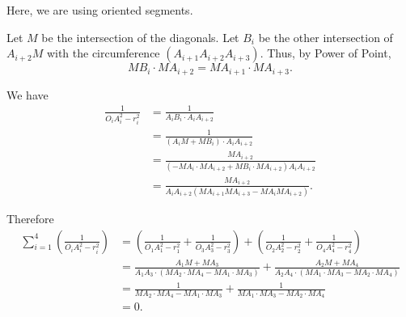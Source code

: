 Here, we are using oriented segments.

Let $M$ be the intersection of the diagonals. Let $B_i$ be the other intersection of $A_{i+2}M$ with the circumference $(A_{i+1}A_{i+2}A_{i+3})$. Thus, by Power of Point, \[MB_i \cdot MA_{i+2} = MA_{i+1} \cdot MA_{i+3}.\]

We have
\begin{align*}
	\frac{1}{O_iA_i^2 - r_i^2} & = \frac{1}{A_iB_i \cdot A_iA_{i+2}} \\
	                         & = \frac{1}{(A_iM + MB_i) \cdot A_iA_{i+2}} \\
							 & = \frac{MA_{i+2}}{(-MA_i \cdot MA_{i+2} + MB_i \cdot MA_{i+2}) A_iA_{i+2}} \\
							 & = \frac{MA_{i+2}}{A_iA_{i+2} (MA_{i+1}MA_{i+3} - MA_iMA_{i+2})}.
\end{align*}

Therefore
\begin{align*}
	\sum_{i=1}^4 \left( \frac{1}{O_iA_i^2 - r_i^2} \right) &= \left(\frac{1}{O_1A_1^2 - r_1^2} + \frac{1}{O_3A_3^2 - r_3^2}\right) + \left( \frac{1}{O_2A_2^2 - r_2^2} + \frac{1}{O_4A_4^2 - r_4^2} \right) \\
														   &= \frac{A_1M + MA_3}{A_1A_3 \cdot (MA_2 \cdot MA_4 - MA_1 \cdot MA_3)} + \frac{A_2M + MA_4}{A_2A_4 \cdot (MA_1 \cdot MA_3 - MA_2 \cdot MA_4)} \\
														   &= \frac{1}{MA_2 \cdot MA_4 - MA_1 \cdot MA_3} + \frac{1}{MA_1 \cdot MA_3 - MA_2 \cdot MA_4} \\
														   &= 0.
\end{align*}
